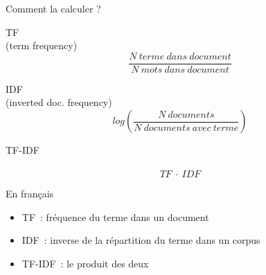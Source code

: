 \documentclass[serif, aspectratio=169]{beamer}
\begin{document}
\begin{frame}{Comment la calculer ?}
    \begin{minipage}{0.3\columnwidth}
        \begin{center}
            TF \\ (term frequency)
            \begin{equation*}
                \frac{N~terme~dans~document}{N~mots~dans~document}
            \end{equation*}
        \end{center}
    \end{minipage}
    \hspace{15pt}
    \begin{minipage}{0.35\columnwidth}
        \begin{center}
            IDF \\ (inverted doc. frequency)
            \begin{equation*}
                log(\frac{N~documents}{N~documents~avec~terme})
            \end{equation*}
        \end{center}
    \end{minipage}
    \hspace{45pt}
    \begin{minipage}{0.1\columnwidth}
        \begin{center}
            TF-IDF \\ \textcolor{white}{TF-IDF}
            \begin{equation*}
                TF~\cdot~IDF
            \end{equation*}
        \end{center}
    \end{minipage}
    \vfill
    \begin{block}{En français}
        \begin{itemize}
            \item TF~: fréquence du terme dans un document
            \item IDF~: inverse de la répartition du terme dans un corpus
            \item TF-IDF~: le produit des deux
        \end{itemize}
    \end{block}
\end{frame}
\end{document}
